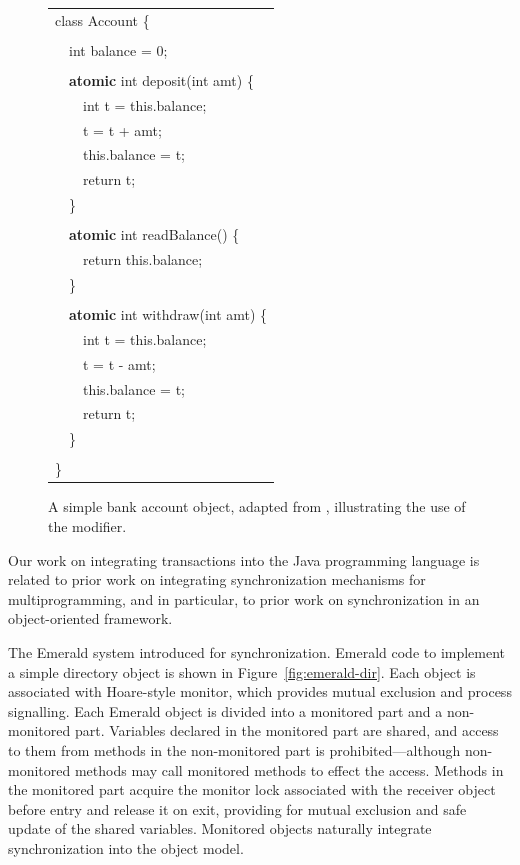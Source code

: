 \begin{figure}
{\ttfamily\sis\small%
\begin{tabular}{l}
class Account \{\\
\\
~~int balance = 0;\\
\\
~~{\bf atomic} int deposit(int amt) \{\\
~~~~int t = this.balance;\\
~~~~t = t + amt;\\
~~~~this.balance = t;\\
~~~~return t;\\
~~\}\\
\\
~~{\bf atomic} int readBalance() \{\\
~~~~return this.balance;\\
~~\}\\
\\
~~{\bf atomic} int withdraw(int amt) \{\\
~~~~int t = this.balance;\\
~~~~t = t - amt;\\
~~~~this.balance = t;\\
~~~~return t;\\
~~\}\\
\\
\}\\
\end{tabular}
}\vspace{.2in}
\caption{A simple bank account object, adapted from \cite{FlanaganQa03},
  illustrating the use of the \atomic modifier.}
\label{fig:atomic}
\end{figure}

Our work on integrating transactions into the Java programming
language is related to prior work on integrating synchronization
mechanisms for multiprogramming, and in particular, to prior work on
synchronization in an object-oriented framework.

\label{sec:emerald}
The Emerald system \cite{BlackHuJuLe86,JulSt91} introduced
 for synchronization.  Emerald code to
implement a simple directory object is shown in
Figure~\ref{fig:emerald-dir}.  Each object is associated with
Hoare-style monitor, which provides mutual exclusion and process
signalling.  Each Emerald object is divided into a monitored part and
a non-monitored part.  Variables declared in the monitored part are
shared, and access to them from methods in the non-monitored part is
prohibited---although non-monitored methods may call monitored methods
to effect the access.  Methods in the monitored part acquire the monitor lock
associated with the receiver object before entry and release it on
exit, providing for mutual exclusion and safe update of the shared
variables.  Monitored objects naturally integrate synchronization into
the object model.

